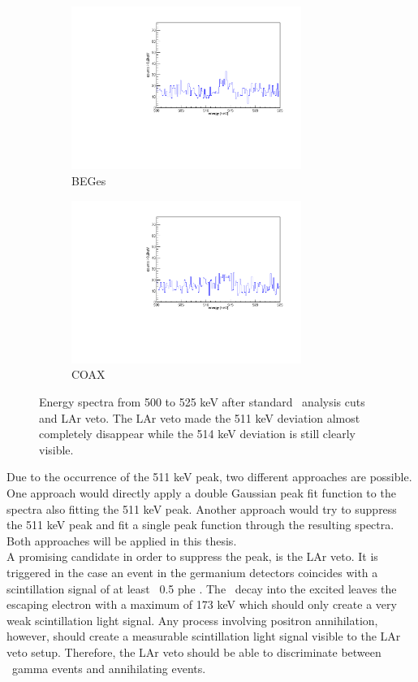 \documentclass[encoding=utf8,british]{tumphthesis}
\begin{document}
\begin{figure}[t!]
\centering
\begin{subfigure}{0.475\textwidth}
	\includegraphics[width=75mm]{./Bilder/500525LArVetoBEGes.pdf}
    \caption{BEGes}
  \label{fig:LArBEGes}
\end{subfigure}\hfill%
\begin{subfigure}{0.475\textwidth}
	\includegraphics[width=75mm]{./Bilder/500525LArVetoCOAX.pdf}
  \caption{COAX}
  \label{fig:LArCOAX}
\end{subfigure}
    \caption{Energy spectra from 500 to 525 keV after standard \gerda\ analysis cuts and LAr veto. The LAr veto made the 511 keV deviation almost completely disappear while the 514 keV deviation is still clearly visible. }
\end{figure}

Due to the occurrence of the 511 keV peak, two different approaches are possible.
One approach would directly apply a double Gaussian peak fit function to the spectra also fitting the 511 keV peak.
Another approach would try to suppress the 511 keV peak and fit a single peak function through the resulting spectra.
Both approaches will be applied in this thesis.
\\

A promising candidate in order to suppress the peak, is the LAr veto.
It is triggered in the case an event in the germanium detectors coincides with a scintillation signal of at least ~0.5 phe \cite{agostini_background_2017}.
The \Kr\ decay into the excited  leaves the escaping electron with a maximum of 173 keV which should only create a very weak scintillation light signal.
Any process involving positron annihilation, however, should create a measurable scintillation light signal visible to the LAr veto setup.
Therefore, the LAr veto should be able to discriminate between \Kr\ gamma events and annihilating events.
\\
\end{document}
